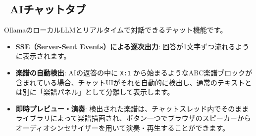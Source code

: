 \subsection{\texorpdfstring{\faComments\ AIチャットタブ}{AIチャットタブ}}

OllamaのローカルLLMとリアルタイムで対話できるチャット機能です。

\begin{itemize}
  \item \textbf{SSE（Server-Sent Events）による逐次出力}: 回答が1文字ずつ流れるように表示されます。
  \item \textbf{楽譜の自動検出}: AIの返答の中に \texttt{X:1} から始まるようなABC楽譜ブロックが含まれている場合、チャットUIがそれを自動的に検出し、通常のテキストとは別に「楽譜パネル」として分離して表示します。
  \item \textbf{即時プレビュー・演奏}: 検出された楽譜は、チャットスレッド内でそのまま  ライブラリによって楽譜描画され、ボタン一つでブラウザのスピーカーからオーディオシンセサイザーを用いて演奏・再生することができます。
\end{itemize}
